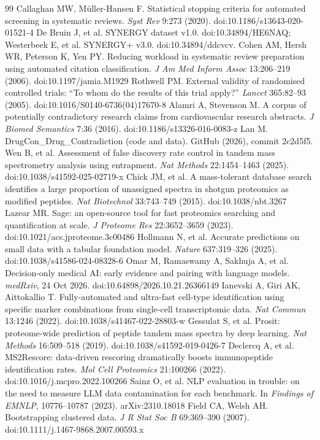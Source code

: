 \documentclass[10pt,twocolumn]{article}
\begin{document}
\begin{thebibliography}{99}
 Callaghan MW, M\"uller-Hansen F. Statistical stopping criteria for automated screening in systematic reviews. \emph{Syst Rev} 9:273 (2020). doi:10.1186/s13643-020-01521-4
 De Bruin J, et al. SYNERGY dataset v1.0. doi:10.34894/HE6NAQ; Westerbeek E, et al. SYNERGY+ v3.0. doi:10.34894/ddcvcv.
 Cohen AM, Hersh WR, Peterson K, Yen PY. Reducing workload in systematic review preparation using automated citation classification. \emph{J Am Med Inform Assoc} 13:206--219 (2006). doi:10.1197/jamia.M1929
 Rothwell PM. External validity of randomised controlled trials: ``To whom do the results of this trial apply?'' \emph{Lancet} 365:82--93 (2005). doi:10.1016/S0140-6736(04)17670-8
 Alamri A, Stevenson M. A corpus of potentially contradictory research claims from cardiovascular research abstracts. \emph{J Biomed Semantics} 7:36 (2016). doi:10.1186/s13326-016-0083-z
 Lan M. DrugCon\_Drug\_Contradiction (code and data). GitHub (2026), commit 2c2d5f5.
 Wen B, et al. Assessment of false discovery rate control in tandem mass spectrometry analysis using entrapment. \emph{Nat Methods} 22:1454--1463 (2025). doi:10.1038/s41592-025-02719-x
 Chick JM, et al. A mass-tolerant database search identifies a large proportion of unassigned spectra in shotgun proteomics as modified peptides. \emph{Nat Biotechnol} 33:743--749 (2015). doi:10.1038/nbt.3267
 Lazear MR. Sage: an open-source tool for fast proteomics searching and quantification at scale. \emph{J Proteome Res} 22:3652--3659 (2023). doi:10.1021/acs.jproteome.3c00486
 Hollmann N, et al. Accurate predictions on small data with a tabular foundation model. \emph{Nature} 637:319--326 (2025). doi:10.1038/s41586-024-08328-6
 Omar M, Ramaswamy A, Sakhuja A, et al. Decision-only medical AI: early evidence and pairing with language models. \emph{medRxiv}, 24 Oct 2026. doi:10.64898/2026.10.21.26366149
 Ianevski A, Giri AK, Aittokallio T. Fully-automated and ultra-fast cell-type identification using specific marker combinations from single-cell transcriptomic data. \emph{Nat Commun} 13:1246 (2022). doi:10.1038/s41467-022-28803-w
 Gessulat S, et al. Prosit: proteome-wide prediction of peptide tandem mass spectra by deep learning. \emph{Nat Methods} 16:509--518 (2019). doi:10.1038/s41592-019-0426-7
 Declercq A, et al. MS2Rescore: data-driven rescoring dramatically boosts immunopeptide identification rates. \emph{Mol Cell Proteomics} 21:100266 (2022). doi:10.1016/j.mcpro.2022.100266
 Sainz O, et al. NLP evaluation in trouble: on the need to measure LLM data contamination for each benchmark. In \emph{Findings of EMNLP}, 10776--10787 (2023). arXiv:2310.18018
 Field CA, Welsh AH. Bootstrapping clustered data. \emph{J R Stat Soc B} 69:369--390 (2007). doi:10.1111/j.1467-9868.2007.00593.x
\end{thebibliography}
\end{document}
